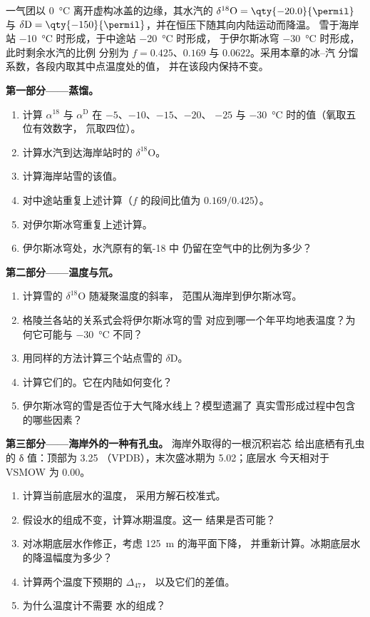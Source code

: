 \begin{problem}\label{pb:b3:stable-isotopes:1}
一气团以 \qty{0}{\celsius} 离开虚构冰盖的边缘，其水汽的
$\delta^{18}\mathrm O = \qty{-20.0}{\permil}$ 与 $\delta\mathrm D =
\qty{-150}{\permil}$，并在恒压下随其向内陆运动而降温。
雪于海岸站 \qty{-10}{\celsius} 时形成，于中途站 \qty{-20}{\celsius} 时形成，
于伊尔斯冰穹 \qty{-30}{\celsius} 时形成，此时剩余水汽的比例
分别为 $f = 0.425$、$0.169$ 与 $0.0622$。采用本章的冰–汽
分馏系数，各段内取其中点温度处的值，
并在该段内保持不变。

\medskip\noindent\textbf{第一部分——蒸馏。}
\begin{enumerate}
\item 计算 $\alpha^{18}$ 与 $\alpha^{\mathrm D}$ 在 $-5$、$-10$、$-15$、$-20$、
$-25$ 与 \qty{-30}{\celsius} 时的值（氧取五位有效数字，
氘取四位）。
\item 计算水汽到达海岸站时的 $\delta^{18}\mathrm O$。
\item 计算海岸站雪的该值。
\item 对中途站重复上述计算（$f$ 的段间比值为 $0.169/0.425$）。
\item 对伊尔斯冰穹重复上述计算。
\item 伊尔斯冰穹处，水汽原有的氧-18 中
仍留在空气中的比例为多少？
\end{enumerate}

\medskip\noindent\textbf{第二部分——温度与氘。}
\begin{enumerate}[resume]
\item 计算雪的 $\delta^{18}\mathrm O$ 随凝聚温度的斜率，
范围从海岸到伊尔斯冰穹。
\item 格陵兰各站的关系式会将伊尔斯冰穹的雪
对应到哪一个年平均地表温度？为何它可能与
\qty{-30}{\celsius} 不同？
\item 用同样的方法计算三个站点雪的 $\delta\mathrm D$。
\item 计算它们的。它在内陆如何变化？
\item 伊尔斯冰穹的雪是否位于大气降水线上？模型遗漏了
真实雪形成过程中包含的哪些因素？
\end{enumerate}

\medskip\noindent\textbf{第三部分——海岸外的一种有孔虫。} 海岸外取得的一根沉积岩芯
给出底栖有孔虫的 δ 值：顶部为 \qty{3.25}{\permil}
（VPDB），末次盛冰期为 \qty{5.02}{\permil}；底层水
今天相对于 VSMOW 为 \qty{0.00}{\permil}。
\begin{enumerate}[resume]
\item 计算当前底层水的温度，
采用方解石校准式。
\item 假设水的组成不变，计算冰期温度。这一
结果是否可能？
\item 对冰期底层水作修正，考虑 \qty{125}{m} 的海平面下降，
并重新计算。冰期底层水的降温幅度为多少？
\item 计算两个温度下预期的 $\Delta_{47}$，
以及它们的差值。
\item 为什么温度计不需要
水的组成？
\end{enumerate}


\end{problem}
